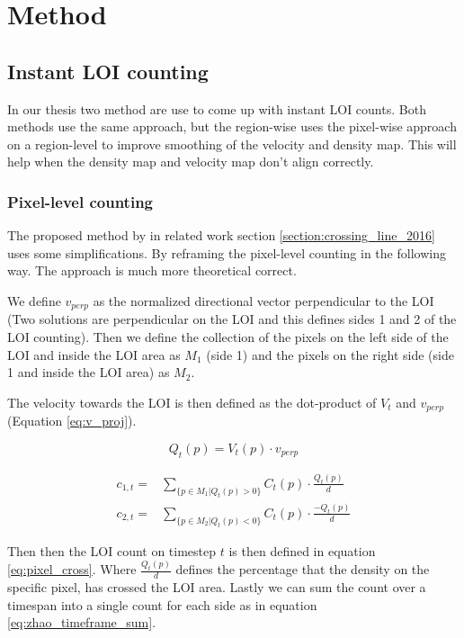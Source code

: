\chapter{Method}

\section{Instant LOI counting}
In our thesis two method are use to come up with instant LOI counts. Both methods use the same approach, but the region-wise uses the pixel-wise approach on a region-level to improve smoothing of the velocity and density map. This will help when the density map and velocity map don't align correctly.

\subsection{Pixel-level counting}
The proposed method by \cite{leibe_crossing-line_2016} in related work section \ref{section:crossing_line_2016} uses some simplifications. By reframing the pixel-level counting in the following way. The approach is much more theoretical correct.

\label{sec:pixel_level}
We define $v_{perp}$ as the normalized directional vector perpendicular to the LOI (Two solutions are perpendicular on the LOI and this defines sides 1 and 2 of the LOI counting). Then we define the collection of the pixels on the left side of the LOI and inside the LOI area as $M_1$ (side 1) and the pixels on the right side (side 1 and inside the LOI area) as $M_2$.

The velocity towards the LOI is then defined as the dot-product of $V_t$ and $v_{perp}$ (Equation \ref{eq:v_proj}).

\begin{equation}
	Q_t(p) = V_t(p) \cdot v_{perp}
	\label{eq:v_proj}
\end{equation}


\begin{equation}
\begin{aligned}
	c_{1,t} =& \sum_{\{p \in M_1 | Q_t(p) > 0\}} C_t(p) \cdot \frac{Q_t(p)}{d}\\
	c_{2,t} =& \sum_{\{p \in M_2 | Q_t(p) < 0\}} C_t(p) \cdot \frac{-Q_t(p)}{d}
\end{aligned}
\label{eq:pixel_cross}
\end{equation}

Then then the LOI count on timestep $t$ is then defined in equation \ref{eq:pixel_cross}. Where $\frac{Q_t(p)}{d}$ defines the percentage that the density on the specific pixel, has crossed the LOI area. Lastly we can sum the count over a timespan into a single count for each side as in equation \ref{eq:zhao_timeframe_sum}.

